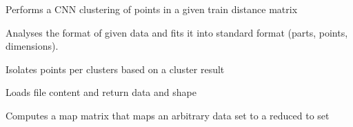 \documentclass[letterpaper,10pt,english]{sphinxmanual}
\begin{document}
\begin{fulllineitems}
\begin{fulllineitems}
\end{fulllineitems}


\begin{fulllineitems}
\label{\detokenize{documentation:cnn.CNN.fit}}
Performs a CNN clustering of points in a given train 
distance matrix

\end{fulllineitems}


\begin{fulllineitems}
\label{\detokenize{documentation:cnn.CNN.get_shape}}
Analyses the format of given data and fits it into standard
format (parts, points, dimensions).

\end{fulllineitems}


\begin{fulllineitems}
\label{\detokenize{documentation:cnn.CNN.isolate}}
Isolates points per clusters based on a cluster result

\end{fulllineitems}


\begin{fulllineitems}
\label{\detokenize{documentation:cnn.CNN.load}}
Loads file content and return data and shape

\end{fulllineitems}


\begin{fulllineitems}
\label{\detokenize{documentation:cnn.CNN.map}}
Computes a map matrix that maps an arbitrary data set to a
reduced to set

\end{fulllineitems}


\end{fulllineitems}
\end{document}
